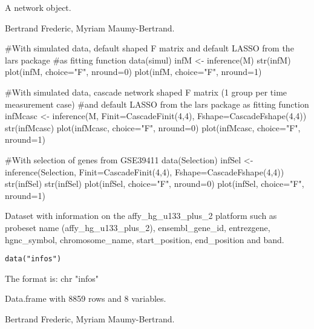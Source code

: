 \documentclass[a4paper]{book}
\begin{document}
%
\begin{Value}
A network object.  
\end{Value}
%
\begin{Author}\relax
Bertrand Frederic, Myriam Maumy-Bertrand.
\end{Author}
%
\begin{Examples}
\begin{ExampleCode}

#With simulated data, default shaped F matrix and default LASSO from the lars package
#as fitting function
data(simul)
infM <- inference(M)
str(infM)
plot(infM, choice="F", nround=0)
plot(infM, choice="F", nround=1)

#With simulated data, cascade network shaped F matrix (1 group per time measurement case) 
#and default LASSO from the lars package as fitting function
infMcasc <- inference(M, Finit=CascadeFinit(4,4), Fshape=CascadeFshape(4,4))
str(infMcasc)
plot(infMcasc, choice="F", nround=0)
plot(infMcasc, choice="F", nround=1)

#With selection of genes from GSE39411
data(Selection)
infSel <- inference(Selection, Finit=CascadeFinit(4,4), Fshape=CascadeFshape(4,4))
str(infSel)
str(infSel)
plot(infSel, choice="F", nround=0)
plot(infSel, choice="F", nround=1)

\end{ExampleCode}
\end{Examples}
%
\begin{Description}\relax
Dataset with information on the affy\_hg\_u133\_plus\_2 platform such as probeset name (affy\_hg\_u133\_plus\_2), ensembl\_gene\_id, entrezgene, hgnc\_symbol, chromosome\_name, start\_position, end\_position and band.
\end{Description}
%
\begin{Usage}
\begin{verbatim}
data("infos")
\end{verbatim}
\end{Usage}
%
\begin{Format}
The format is:
chr "infos"
\end{Format}
%
\begin{Details}\relax
Data.frame with 8859 rows and 8 variables.
\end{Details}
%
\begin{Author}\relax
Bertrand Frederic, Myriam Maumy-Bertrand.
\end{Author}
\end{document}
